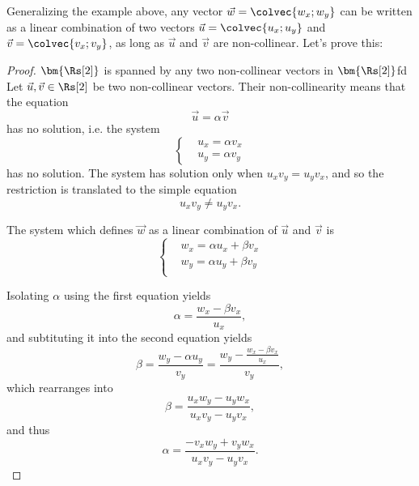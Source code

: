 Generalizing the example above, any vector $\vec{w}=\colvec{w_{x};w_{y}}$ can be written as a linear combination of two vectors $\vec{u}=\colvec{u_{x};u_{y}}$ and $\vec{v}=\colvec{v_{x};v_{y}}$, as long as $\vec{u}$ and $\vec{v}$ are non-collinear. Let's prove this:
\begin{proof}{$\bm{\Rs[2]}$ is spanned by any two non-collinear vectors in $\bm{\Rs[2]}$}{fd}
	Let $\vec{u},\vec{v}\in\Rs[2]$ be two non-collinear vectors. Their non-collinearity means that the equation
	\begin{equation}
		\vec{u} = \alpha\vec{v}
		\label{eq:collinear vectors}
	\end{equation}
	has no solution, i.e. the system
	\begin{equation}
		\begin{cases}
			&u_{x} = \alpha v_{x}\\
			&u_{y} = \alpha v_{y}
		\end{cases}
		\label{eq:collinear system}
	\end{equation}
	has no solution. The system has solution only when $u_{x}v_{y} = u_{y}v_{x}$, and so the restriction is translated to the simple equation
	\begin{equation}
		u_{x}v_{y} \neq u_{y}v_{x}.
		\label{eq:restriction}
	\end{equation}

	The system which defines $\vec{w}$ as a linear combination of $\vec{u}$ and $\vec{v}$ is
	\begin{equation}
		\begin{cases}
			&w_{x} = \alpha u_{x} + \beta v_{x}\\
			&w_{y} = \alpha u_{y} + \beta v_{y}\\
		\end{cases}
		\label{eq:linear combination of two vectors}
	\end{equation}

	Isolating $\alpha$ using the first equation yields
	\begin{equation}
		\alpha = \frac{w_{x}-\beta v_{x}}{u_{x}},
		\label{eq:isolation1}
	\end{equation}
	and subtituting it into the second equation yields
	\begin{equation}
		\beta = \frac{w_{y}-\alpha u_{y}}{v_{y}} = \frac{w_{y}-\frac{w_{x}-\beta v_{x}}{u_{x}}}{v_{y}},
		\label{eq:isolation2}
	\end{equation}
	which rearranges into
	\begin{equation}
		\beta = \frac{u_{x} w_{y} - u_{y} w_{x}}{u_{x} v_{y} - u_{y} v_{x}},
		\label{eq:test}
	\end{equation}
	and thus
	\begin{equation}
		\alpha = \frac{- v_{x} w_{y} + v_{y} w_{x}}{u_{x} v_{y} - u_{y} v_{x}}.
		\label{eq:test2}
	\end{equation}


\end{proof}
